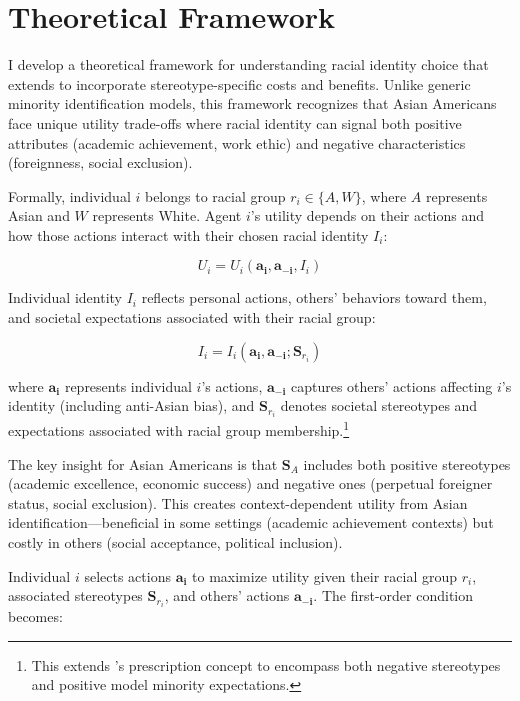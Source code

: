 \section{Theoretical Framework}\label{sec:model}

I develop a theoretical framework for understanding racial identity choice that extends \textcite{akerlofEconomicsIdentity2000} to incorporate stereotype-specific costs and benefits. Unlike generic minority identification models, this framework recognizes that Asian Americans face unique utility trade-offs where racial identity can signal both positive attributes (academic achievement, work ethic) and negative characteristics (foreignness, social exclusion).

Formally, individual $i$ belongs to racial group $r_i \in \{A, W\}$, where $A$ represents Asian and $W$ represents White. Agent $i$'s utility depends on their actions and how those actions interact with their chosen racial identity $I_i$:

\begin{equation}
U_i = U_i(\pmb{a_i}, \pmb{a_{-i}}, I_i)\label{eq:util}
\end{equation}

Individual identity $I_i$ reflects personal actions, others' behaviors toward them, and societal expectations associated with their racial group:

\begin{equation}
I_i = I_i(\pmb{a_i}, \pmb{a_{-i}}; \pmb{S}_{r_{i}})\label{eq:identity}
\end{equation}

where $\pmb{a_i}$ represents individual $i$'s actions, $\pmb{a_{-i}}$ captures others' actions affecting $i$'s identity (including anti-Asian bias), and $\pmb{S}_{r_{i}}$ denotes societal stereotypes and expectations associated with racial group membership.\footnote{This extends \textcite{akerlofEconomicsIdentity2000}'s prescription concept to encompass both negative stereotypes and positive model minority expectations.}

The key insight for Asian Americans is that $\pmb{S}_{A}$ includes both positive stereotypes (academic excellence, economic success) and negative ones (perpetual foreigner status, social exclusion). This creates context-dependent utility from Asian identification---beneficial in some settings (academic achievement contexts) but costly in others (social acceptance, political inclusion).

Individual $i$ selects actions $\pmb{a_i}$ to maximize utility given their racial group $r_i$, associated stereotypes $\pmb{S}_{r_{i}}$, and others' actions $\pmb{a_{-i}}$. The first-order condition becomes:

